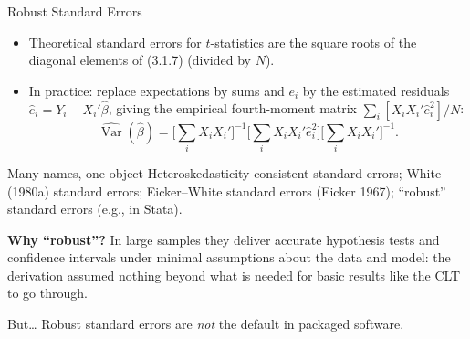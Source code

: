 \documentclass[aspectratio=169,11pt]{beamer}
\newcommand{\Var}{\operatorname{Var}}
\begin{document}
\begin{frame}{Robust Standard Errors}
\small

\begin{itemize}
    \item Theoretical standard errors for $t$-statistics are the square roots
    of the diagonal elements of (3.1.7) (divided by $N$).
    \item In practice: replace expectations by sums and $e_i$ by the
    estimated residuals $\hat e_i=Y_i-X_i'\hat\beta$, giving the empirical
    fourth-moment matrix $\sum_i[X_iX_i'\hat e_i^2]/N$:
    \[
    \widehat{\Var}(\hat\beta)
    = \Big[\sum_iX_iX_i'\Big]^{-1}
      \Big[\sum_iX_iX_i'\hat e_i^2\Big]
      \Big[\sum_iX_iX_i'\Big]^{-1}.
    \]
\end{itemize}

\begin{block}{Many names, one object}
Heteroskedasticity-consistent standard errors; White (1980a) standard errors;
Eicker--White standard errors (Eicker 1967); ``robust'' standard errors
(e.g., in Stata).
\end{block}

\medskip

\textbf{Why ``robust''?} In large samples they deliver accurate hypothesis
tests and confidence intervals under minimal assumptions about the data and
model: the derivation assumed nothing beyond what is needed for basic results
like the CLT to go through.

\begin{alertblock}{But\ldots}
Robust standard errors are \emph{not} the default in packaged software.
\end{alertblock}

\end{frame}
\end{document}
